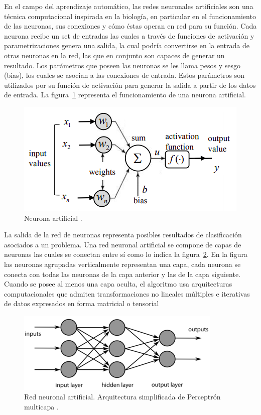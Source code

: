 En el campo del aprendizaje automático, las redes neuronales artificiales son una técnica computacional inspirada en la biología, en particular en el funcionamiento de las neuronas, sus conexiones y cómo éstas operan en red para su función. Cada neurona recibe un set de entradas las cuales a través de funciones de activación y parametrizaciones genera una salida, la cual podría convertirse en la entrada de otras neuronas en la red, las que en conjunto son capaces de generar un resultado. Los parámetros que poseen las neuronas se les llama pesos y sesgo (bias), los cuales se asocian a las conexiones de entrada. Estos parámetros son utilizados por su función de activación para generar la salida a partir de los datos de entrada. La figura~\ref{fig:neurona} representa el funcionamiento de una neurona artificial.

\begin{figure}[th]
\centering
\includegraphics[scale = 1.1]{Figures/figura_03.PNG}
\decoRule
\caption[Neurona]{Neurona artificial \parencite{r64}.}
\label{fig:neurona}
\end{figure}

La salida de la red de neuronas representa posibles resultados de clasificación asociados a un problema. Una red neuronal artificial se compone de capas de neuronas las cuales se conectan entre sí como lo indica la figura~\ref{fig:red}. En la figura las neuronas agrupadas verticalmente representan una capa, cada neurona se conecta con todas las neuronas de la capa anterior y las de la capa siguiente. Cuando se posee al menos una capa oculta, el algoritmo usa arquitecturas computacionales que admiten transformaciones no lineales múltiples e iterativas de datos expresados en forma matricial o tensorial \parencite{r1}

\begin{figure}[th]
\centering
\includegraphics[scale = 1.1]{Figures/figura_04.PNG}
\decoRule
\caption[Neurona]{Red neuronal artificial. Arquitectura simplificada de Perceptrón multicapa \parencite{r13}.}
\label{fig:red}
\end{figure}

